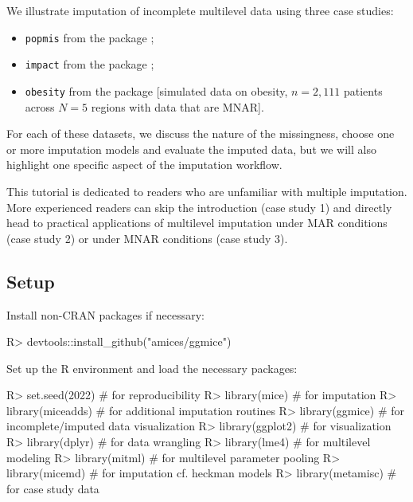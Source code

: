 \documentclass[
]{jss}
\providecommand{\tightlist}{%
  \setlength{\itemsep}{0pt}\setlength{\parskip}{0pt}}
\begin{document}
We illustrate imputation of incomplete multilevel data using three case
studies:

\begin{itemize}
\tightlist
\item
  \texttt{popmis} from the  package \citep[simulated data on
  perceived popularity, \(n = 2,000\) pupils across \(N = 100\) schools
  with data that are MAR,][]{mice};
\item
  \texttt{impact} from the  package \citep[empirical data
  on traumatic brain injuries, \(n = 11,022\) patients across \(N = 15\)
  studies with data that are MAR,][]{metamisc};
\item
  \texttt{obesity} from the  package {[}simulated data on
  obesity, \(n = 2,111\) patients across \(N = 5\) regions with data
  that are MNAR{]}.
\end{itemize}

For each of these datasets, we discuss the nature of the missingness,
choose one or more imputation models and evaluate the imputed data, but
we will also highlight one specific aspect of the imputation workflow.

This tutorial is dedicated to readers who are unfamiliar with multiple
imputation. More experienced readers can skip the introduction (case
study 1) and directly head to practical applications of multilevel
imputation under MAR conditions (case study 2) or under MNAR conditions
(case study 3).

\hypertarget{setup}{%
\subsection{Setup}\label{setup}}

Install non-CRAN packages if necessary:

\begin{CodeChunk}
\begin{CodeInput}
R> devtools::install_github("amices/ggmice")
\end{CodeInput}
\end{CodeChunk}

Set up the R environment and load the necessary packages:

\begin{CodeChunk}
\begin{CodeInput}
R> set.seed(2022)        # for reproducibility
R> library(mice)         # for imputation
R> library(miceadds)     # for additional imputation routines
R> library(ggmice)       # for incomplete/imputed data visualization
R> library(ggplot2)      # for visualization
R> library(dplyr)        # for data wrangling
R> library(lme4)         # for multilevel modeling
R> library(mitml)        # for multilevel parameter pooling
R> library(micemd)  # for imputation cf. heckman models
R> library(metamisc)     # for case study data
\end{CodeInput}
\end{CodeChunk}
\end{document}
